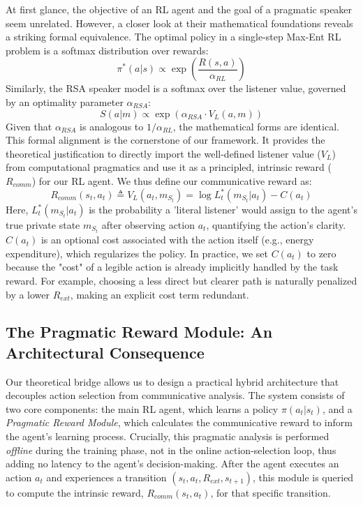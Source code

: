 \documentclass{article}
\begin{document}
At first glance, the objective of an RL agent and the goal of a pragmatic speaker seem unrelated. However, a closer look at their mathematical foundations reveals a striking formal equivalence. The optimal policy in a single-step Max-Ent RL problem is a softmax distribution over rewards:
\begin{equation}
\pi^{*}(a|s)\propto \exp\left(\frac{R(s,a)}{\alpha_{RL}}\right) \label{eq:maxent_policy}
\end{equation}
Similarly, the RSA speaker model is a softmax over the listener value, governed by an optimality parameter $\alpha_{RSA}$:
\begin{equation}
S(a|m)\propto \exp(\alpha_{RSA}\cdot V_{L}(a,m)) \label{eq:rsa_policy}
\end{equation}
Given that $\alpha_{RSA}$ is analogous to $1/\alpha_{RL}$, the mathematical forms are identical. This formal alignment is the cornerstone of our framework. It provides the theoretical justification to directly import the well-defined listener value ($V_L$) from computational pragmatics and use it as a principled, intrinsic reward ($R_{comm}$) for our RL agent. We thus define our communicative reward as:
\begin{equation}
    R_{comm}(s_t, a_t) \triangleq V_L(a_t, m_{S_t}) = \log L_t^*(m_{S_t}|a_t) - C(a_t) \label{eq:comm_reward_def}
\end{equation}
Here, $L_t^*(m_{S_t}|a_t)$ is the probability a 'literal listener' would assign to the agent's true private state $m_{S_t}$ after observing action $a_t$, quantifying the action's clarity. $C(a_t)$ is an optional cost associated with the action itself (e.g., energy expenditure), which regularizes the policy. In practice, we set $C(a_t)$ to zero because the "cost" of a legible action is already implicitly handled by the task reward. For example, choosing a less direct but clearer path is naturally penalized by a lower $R_{ext}$, making an explicit cost term redundant.

\subsection{The Pragmatic Reward Module: An Architectural Consequence}
\label{ssec:architecture}

Our theoretical bridge allows us to design a practical hybrid architecture that decouples action selection from communicative analysis. The system consists of two core components: the main RL agent, which learns a policy $\pi(a_t|s_t)$, and a \textit{Pragmatic Reward Module}, which calculates the communicative reward to inform the agent's learning process. Crucially, this pragmatic analysis is performed \textit{offline} during the training phase, not in the online action-selection loop, thus adding no latency to the agent's decision-making. After the agent executes an action $a_t$ and experiences a transition $(s_t, a_t, R_{ext}, s_{t+1})$, this module is queried to compute the intrinsic reward, $R_{comm}(s_t, a_t)$, for that specific transition.
\end{document}

